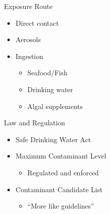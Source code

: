\begin{frame}{Exposure Route}

	\begin{itemize}
		\item Direct contact
		\item Aerosols
		\item Ingestion
		\begin{itemize}
			\item Seafood/Fish 
			\item Drinking water
			\item Algal supplements
		\end{itemize}
	\end{itemize}

\end{frame}
\begin{frame}{Law and Regulation}

	\begin{itemize}
		\item Safe Drinking Water Act
		\item Maximum Contaminant Level
		\begin{itemize}
			\item Regulated and enforced
		\end{itemize}
		\item Contaminant Candidate List
		\begin{itemize}
			\item ``More like guidelines''
		\end{itemize}
	\end{itemize}
\end{frame}


